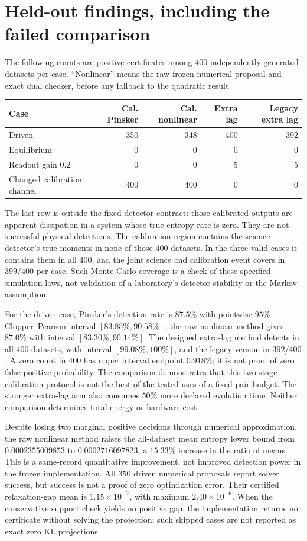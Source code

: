 \section{Held-out findings, including the failed comparison}
The following counts are positive certificates among $400$ independently
generated datasets per case. ``Nonlinear'' means the raw frozen numerical
proposal and exact dual checker, before any fallback to the quadratic result.
\begin{center}
\begin{tabular}{lrrrr}
\hline
Case & Cal. Pinsker & Cal. nonlinear & Extra lag & Legacy extra lag\\
\hline
Driven &350&348&400&392\\
Equilibrium &0&0&0&0\\
Readout gain $0.2$ &0&0&5&5\\
Changed calibration channel &400&400&0&0\\
\hline
\end{tabular}
\end{center}
The last row is outside the fixed-detector contract: those calibrated outputs
are apparent dissipation in a system whose true entropy rate is zero.
They are not successful physical detections. The calibration region contains
the science detector's true moments in none of those $400$ datasets. In the
three valid cases it contains them in all $400$, and the joint science and
calibration event covers in $399/400$ per case. Such Monte Carlo coverage is
a check of these specified simulation laws, not validation of a laboratory's
detector stability or the Markov assumption.

For the driven case, Pinsker's detection rate is $87.5\%$ with pointwise
$95\%$ Clopper--Pearson interval $[83.85\%,90.58\%]$; the raw nonlinear
method gives $87.0\%$ with interval $[83.30\%,90.14\%]$.
The designed extra-lag method detects in all $400$ datasets, with interval
$[99.08\%,100\%]$, and the legacy version in $392/400$.
A zero count in $400$ has upper interval endpoint $0.918\%$; it is not proof
of zero false-positive probability. The comparison demonstrates that this
two-stage calibration protocol is not the best of the tested uses of a fixed
pair budget. The stronger extra-lag arm also consumes $50\%$ more declared
evolution time. Neither comparison determines total energy or hardware cost.

Despite losing two marginal positive decisions through numerical approximation,
the raw nonlinear method raises the all-dataset mean entropy lower bound from
$0.0002355009853$ to $0.0002716097823$, a $15.33\%$ increase in the ratio
of means. This is a same-record quantitative improvement, not improved
detection power in the frozen implementation. All $350$ driven numerical
proposals report solver success, but success is not a proof of zero
optimization error. Their certified relaxation-gap mean is
$1.15\times10^{-7}$, with maximum $2.40\times10^{-6}$.
When the conservative support check yields no positive gap, the implementation
returns no certificate without solving the projection; such skipped cases are
not reported as exact zero KL projections.

